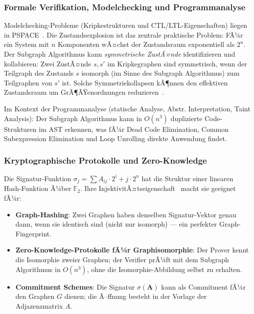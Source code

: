 ﻿\documentclass[a4paper,12pt]{article}
\theoremstyle{definition}
\begin{document}
\subsubsection{Formale Verifikation, Modelchecking und Programmanalyse}

Modelchecking-Probleme (Kripkestrukturen und CTL/LTL-Eigenschaften) liegen
in PSPACE~\cite{clarke1999model}. Die Zustandsexplosion ist das zentrale
praktische Problem: FÃ¼r ein System mit $n$ Komponenten wÃ¤chst der Zustandsraum
exponentiell als $2^n$.
Der Subgraph Algorithmus kann \emph{symmetrische ZustÃ¤nde} identifizieren
und kollabieren: Zwei ZustÃ¤nde $s, s'$ im Kripkegraphen sind symmetrisch,
wenn der Teilgraph des Zustands $s$ isomorph (im Sinne des Subgraph Algorithmus)
zum Teilgraphen von $s'$ ist.
Solche Symmetriekollapsen kÃ¶nnen den effektiven Zustandsraum um GrÃ¶ÃŸenordnungen
reduzieren~\cite{clarke1999model}.

Im Kontext der Programmanalyse (statische Analyse, Abstr. Interpretation, Taint Analysis):
Der Subgraph Algorithmus kann in $O(n^3)$ duplizierte Code-Strukturen im AST erkennen,
was fÃ¼r Dead Code Elimination, Common Subexpression Elimination und Loop Unrolling
direkte Anwendung findet.

\subsubsection{Kryptographische Protokolle und Zero-Knowledge}

Die Signatur-Funktion $\sigma_j = \sum A_{ij} \cdot 2^i + j \cdot 2^n$ hat
die Struktur einer linearen Hash-Funktion Ã¼ber $\mathbb{F}_2$.
Ihre InjektivitÃ¤tseigenschaft~\cite{epp2026subgraph} macht sie geeignet fÃ¼r:
\begin{itemize}
  \item \textbf{Graph-Hashing}: Zwei Graphen haben denselben Signatur-Vektor
        genau dann, wenn sie identisch sind (nicht nur isomorph) ---
        ein perfekter Graph-Fingerprint.
  \item \textbf{Zero-Knowledge-Protokolle fÃ¼r Graphisomorphie}:
        Der Prover kennt die Isomorphie zweier Graphen; der Verifier
        prÃ¼ft mit dem Subgraph Algorithmus in $O(n^3)$, ohne die Isomorphie-Abbildung
        selbst zu erhalten.
  \item \textbf{Commitment Schemes}: Die Signatur $\sigma(\boldsymbol{A})$ kann
        als Commitment fÃ¼r den Graphen $G$ dienen; die Ã–ffnung besteht
        in der Vorlage der Adjazenzmatrix $A$.
\end{itemize}
\end{document}
